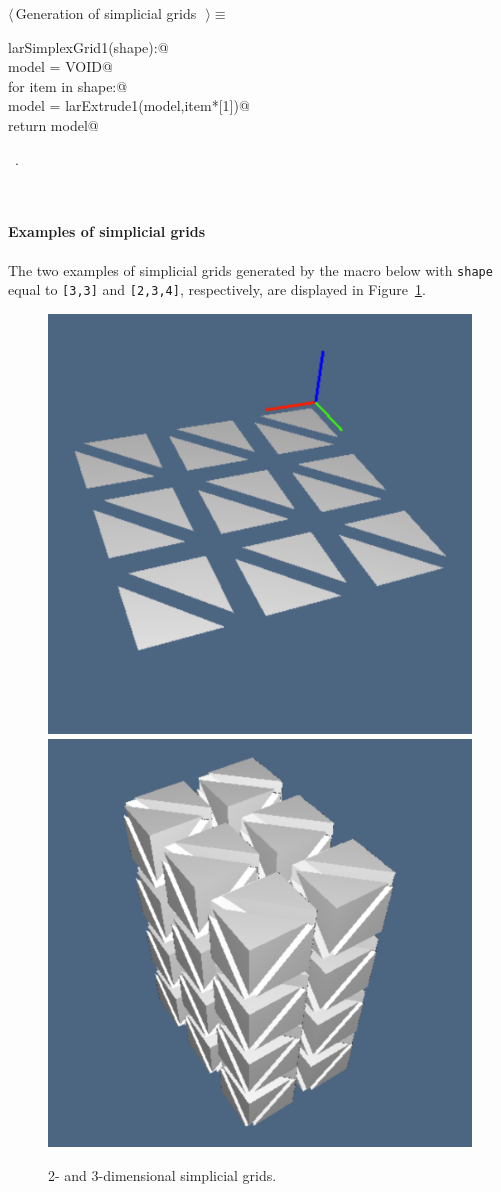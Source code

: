 \documentclass[11pt,oneside]{article}	%
\begin{document}
\begin{flushleft} \small
\begin{minipage}{\linewidth} \label{scrap6}
$\langle\,$Generation of simplicial grids\nobreak\ {\footnotesize {}}$\,\rangle\equiv$
\vspace{-1ex}
\begin{list}{}{} \item
\mbox{}\verb@def larSimplexGrid1(shape):@\\
\mbox{}\verb@    model = VOID@\\
\mbox{}\verb@    for item in shape:@\\
\mbox{}\verb@        model = larExtrude1(model,item*[1])@\\
\mbox{}\verb@    return model@\\
\mbox{}\verb@@{\NWsep}
\end{list}
\vspace{-1ex}
\footnotesize\addtolength{\baselineskip}{-1ex}
\begin{list}{}{\setlength{\itemsep}{-\parsep}\setlength{\itemindent}{-\leftmargin}}
\item \NWtxtMacroRefIn\ .
\end{list}
\end{minipage}\\[4ex]
\end{flushleft}


\paragraph{Examples of simplicial grids} The two examples of simplicial grids generated by the macro below with \texttt{shape} equal to \texttt{[3,3]} and \texttt{[2,3,4]}, respectively, are displayed in Figure~\ref{fig:simplexn-3}.

\begin{figure}[htbp] %
   \centering
   \includegraphics[height=0.25\linewidth,width=0.25\linewidth]{images/simplexn-3a} 
   \includegraphics[height=0.25\linewidth,width=0.25\linewidth]{images/simplexn-3b} 
   \caption{2- and 3-dimensional simplicial grids.}
   \label{fig:simplexn-3}
\end{figure}
\end{document}

